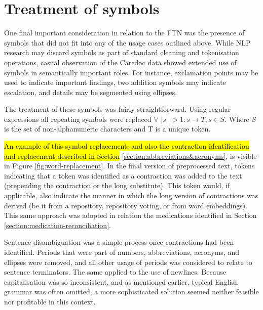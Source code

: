\section{Treatment of symbols}

One final important consideration in relation to the FTN was the presence of symbols that did not fit into any of the usage cases outlined above. While NLP research may discard symbols as part of standard cleaning and tokenisation operations, casual observation of the Caredoc data showed extended use of symbols in semantically important roles. For instance, exclamation points may be used to indicate important findings, two addition symbols may indicate escalation, and details may be segmented using ellipses.  

The treatment of these symbols was fairly straightforward. Using regular expressions all repeating symbols were replaced 
$\forall \textit{ |s| } > 1 : s \longrightarrow T, \textit{s} \in S $. Where \textit{S} is the set of non-alphanumeric characters and T is a unique token. 

\hl{An example of this symbol replacement, and also the contraction identification and replacement described in Section} \ref{section:abbreviations&acronyms}, is visible in Figure \ref{fig:word-replacement}.  In the final version of preprocessed text, tokens indicating that a token was identified as a  contraction was added to the text (prepending the contraction or the long substitute). This token would, if applicable, also indicate the manner in which the long version of contractions was derived (be it from a repository, repository voting, or from word embeddings). This same approach was adopted in relation the medications identified in Section \ref{section:medication-reconciliation}.    

Sentence disambiguation was a simple process once contractions had been identified. Periods that were part of numbers, abbreviations, acronyms, and ellipses were removed, and all other usage of periods was considered to relate to sentence terminators. The same applied to the use of newlines. Because capitalisation was so inconsistent, and as mentioned earlier, typical English grammar was often omitted, a more sophisticated solution seemed neither feasible nor profitable in this context.  




